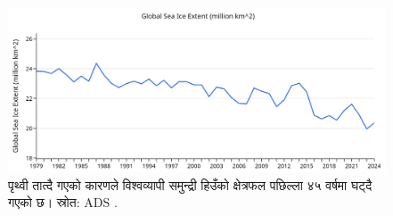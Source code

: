 \documentclass[10pt,twocolumn,letterpaper]{article}
\begin{document}
\begin{figure}[t]
\begin{center}
\includegraphics[width=1\textwidth]{ice.jpg}
\end{center}
   \caption{पृथ्वी तात्दै गएको कारणले विश्वव्यापी समुन्द्री हिउँको क्षेत्रफल पछिल्ला ४५ वर्षमा घट्दै गएको छ। स्रोत: ADS \cite{149}.}
\label{fig:24}
\end{figure}

\clearpage
\twocolumn

{\small


}
\end{document}
